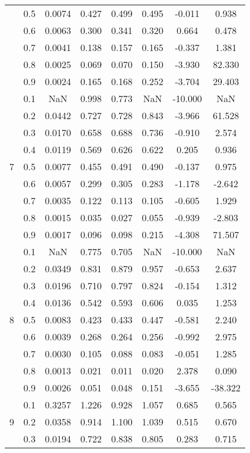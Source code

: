 \documentclass[11pt,a4paper]{report}
\begin{document}
\begin{longtable}{ | c | c || c | c | c | c | c | c | }
 & 0.5 & 0.0074 & 0.427 & 0.499 & 0.495 & -0.011 & 0.938 \\
 & 0.6 & 0.0063 & 0.300 & 0.341 & 0.320 & 0.664 & 0.478 \\
 & 0.7 & 0.0041 & 0.138 & 0.157 & 0.165 & -0.337 & 1.381 \\
 & 0.8 & 0.0025 & 0.069 & 0.070 & 0.150 & -3.930 & 82.330 \\
 & 0.9 & 0.0024 & 0.165 & 0.168 & 0.252 & -3.704 & 29.403 \\
 \hline
\multirow{9}{*}{7} & 0.1 & NaN & 0.998 & 0.773 & NaN & -10.000 & NaN \\
 & 0.2 & 0.0442 & 0.727 & 0.728 & 0.843 & -3.966 & 61.528 \\
 & 0.3 & 0.0170 & 0.658 & 0.688 & 0.736 & -0.910 & 2.574 \\
 & 0.4 & 0.0119 & 0.569 & 0.626 & 0.622 & 0.205 & 0.936 \\
 & 0.5 & 0.0077 & 0.455 & 0.491 & 0.490 & -0.137 & 0.975 \\
 & 0.6 & 0.0057 & 0.299 & 0.305 & 0.283 & -1.178 & -2.642 \\
 & 0.7 & 0.0035 & 0.122 & 0.113 & 0.105 & -0.605 & 1.929 \\
 & 0.8 & 0.0015 & 0.035 & 0.027 & 0.055 & -0.939 & -2.803 \\
 & 0.9 & 0.0017 & 0.096 & 0.098 & 0.215 & -4.308 & 71.507 \\
 \hline
\multirow{9}{*}{8} & 0.1 & NaN & 0.775 & 0.705 & NaN & -10.000 & NaN \\
 & 0.2 & 0.0349 & 0.831 & 0.879 & 0.957 & -0.653 & 2.637 \\
 & 0.3 & 0.0196 & 0.710 & 0.797 & 0.824 & -0.154 & 1.312 \\
 & 0.4 & 0.0136 & 0.542 & 0.593 & 0.606 & 0.035 & 1.253 \\
 & 0.5 & 0.0083 & 0.423 & 0.433 & 0.447 & -0.581 & 2.240 \\
 & 0.6 & 0.0039 & 0.268 & 0.264 & 0.256 & -0.992 & 2.975 \\
 & 0.7 & 0.0030 & 0.105 & 0.088 & 0.083 & -0.051 & 1.285 \\
 & 0.8 & 0.0013 & 0.021 & 0.011 & 0.020 & 2.378 & 0.090 \\
 & 0.9 & 0.0026 & 0.051 & 0.048 & 0.151 & -3.655 & -38.322 \\
 \hline
\multirow{9}{*}{9} & 0.1 & 0.3257 & 1.226 & 0.928 & 1.057 & 0.685 & 0.565 \\
 & 0.2 & 0.0358 & 0.914 & 1.100 & 1.039 & 0.515 & 0.670 \\
 & 0.3 & 0.0194 & 0.722 & 0.838 & 0.805 & 0.283 & 0.715 \\

\end{longtable}
\end{document}
